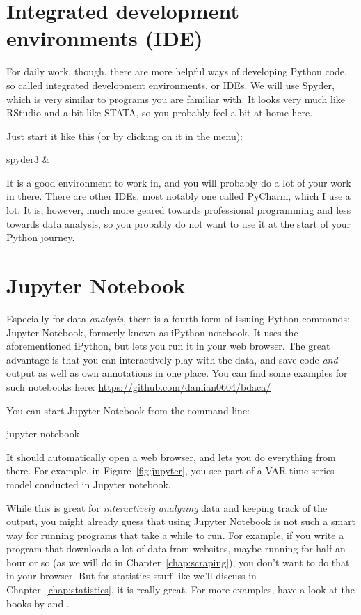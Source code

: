 \documentclass[a4paper,12pt]{book}
\begin{document}
\section{Integrated development environments (IDE)}

For daily work, though, there are more helpful ways of developing Python code, so called integrated development environments, or IDEs. We will use Spyder, which is very similar to programs you are familiar with. It looks very much like RStudio and a bit like STATA, so you probably feel a bit at home here.

Just start it like this (or by clicking on it in the menu):

\begin{lstlistingbash}
spyder3 &
\end{lstlistingbash}

It is a good environment to work in, and you will probably do a lot of your work in there. There are other IDEs, most notably one called PyCharm, which I use a lot. It is, however, much more geared towards professional programming and less towards data analysis, so you probably do not want to use it at the start of your Python journey.

 
\section{Jupyter Notebook}
\label{sec:jupyter}
Especially for data \emph{analysis}, there is a fourth form of issuing Python commands: Jupyter Notebook, formerly known as iPython notebook. It uses the aforementioned iPython, but lets you run it in your web browser. The great advantage is that you can interactively play with the data, and save code \emph{and} output as well as own annotations in one place. You can find some examples for such notebooks here: \url{https://github.com/damian0604/bdaca/} 

You can start Jupyter Notebook from the command line:

\begin{lstlistingbash}
jupyter-notebook 
\end{lstlistingbash}

It should automatically open a web browser, and lets you do everything from there. For example, in Figure~\ref{fig:jupyter}, you see part of a VAR time-series model conducted in Jupyter notebook.

While this is great for \emph{interactively analyzing} data and keeping track of the output, you might already guess that using Jupyter Notebook is not such a smart way for running programs that take a while to run. For example, if you write a program that downloads a lot of data from websites, maybe running for half an hour or so (as we will do in Chapter~\ref{chap:scraping}), you don't want to do that in your browser. But for statistics stuff like we'll discuss in Chapter~\ref{chap:statistics}, it is really great. For more examples, have a look at the books by \cite{McKinney2012} and \cite{Russel2013}. 
\end{document}
